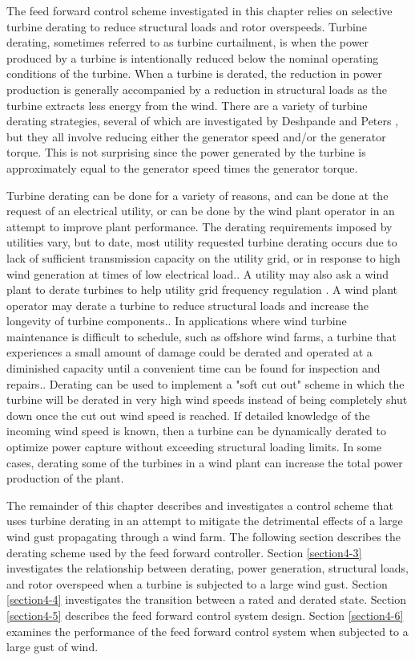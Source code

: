 The feed forward control scheme investigated in this chapter relies on selective turbine derating to reduce structural loads and rotor overspeeds. Turbine derating, sometimes referred to as turbine curtailment, is when the power produced by a turbine is intentionally reduced below the nominal operating conditions of the turbine. When a turbine is derated, the reduction in power production is generally accompanied by a reduction in structural loads as the turbine extracts less energy from the wind. There are a variety of turbine derating strategies, several of which are investigated by Deshpande and Peters \cite{deshpande2012}, but they all involve reducing either the generator speed and/or the generator torque. This is not surprising since the power generated by the turbine is approximately equal to the generator speed times the generator torque.

Turbine derating can be done for a variety of reasons, and can be done at the request of an electrical utility, or can be done by the wind plant operator in an attempt to improve plant performance. The derating requirements imposed by utilities vary, but to date, most utility requested turbine derating occurs due to lack of sufficient transmission capacity on the utility grid, or in response to high wind generation at times of low electrical load.\cite{fink2009}. A utility may also ask a wind plant to derate turbines to help utility grid frequency regulation \cite{aho2012,aho2013}. A wind plant operator may derate a turbine to reduce structural loads and increase the longevity of turbine components.\cite{biegel2013}. In applications where wind turbine maintenance is difficult to schedule, such as offshore wind farms, a turbine that experiences a small amount of damage could be derated and operated at a diminished capacity until a convenient time can be found for inspection and repairs.\cite{richards2014,griffith2015}. Derating can be used to implement a "soft cut out" scheme in which the turbine will be derated in very high wind speeds instead of being completely shut down once the cut out wind speed is reached. \cite{jelavic2013} If detailed knowledge of the incoming wind speed is known, then a turbine can be dynamically derated to optimize power capture without exceeding structural loading limits.\cite{petrovic2014,petrovic2015,jelavic2013} In some cases, derating some of the turbines in a wind plant can increase the total power production of the plant.\cite{carlen2010} 
 
 The remainder of this chapter describes and investigates a control scheme that uses turbine derating in an attempt to mitigate the detrimental effects of a large wind gust propagating through a wind farm. The following section describes the derating scheme used by the feed forward controller. Section \ref{section4-3} investigates the relationship between derating, power generation, structural loads, and rotor overspeed when a turbine is subjected to a large wind gust. Section \ref{section4-4} investigates the transition between a rated and derated state. Section \ref{section4-5} describes the feed forward control system design. Section \ref{section4-6} examines the performance of the feed forward control system when subjected to a large gust of wind. 


